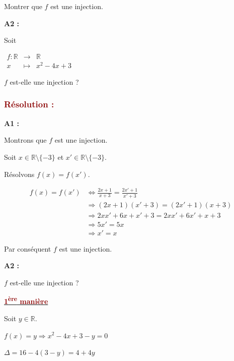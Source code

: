 \documentclass[12pt,a4paper]{article}
\begin{document}
Montrer que $f$ est une injection.


\bigskip

\textbf{A2 :}

Soit 

\(
\begin{array}{rcl}
f:\mathbb{R} & \longrightarrow & \mathbb{R}\\
x & \longmapsto & x^2-4x+3
\end{array}
\)

$f$ est-elle une injection ?


\subsubsection*{\textcolor{darkred}{Résolution :}}

\textbf{A1 :}

Montrons que $f$ est une injection.

Soit $x\in\mathbb{R}\setminus\{-3\}$ et
$x'\in\mathbb{R}\setminus\{-3\}$.

Résolvons $f(x)=f(x')$.

\[
\begin{aligned}
f(x)=f(x')
&\Longleftrightarrow
\frac{2x+1}{x+3}
=
\frac{2x'+1}{x'+3}\\
&\Longrightarrow
(2x+1)(x'+3)
=
(2x'+1)(x+3)\\
&\Longrightarrow
2xx'+6x+x'+3
=
2xx'+6x'+x+3\\
&\Longrightarrow
5x'=5x\\
&\Longrightarrow
x'=x
\end{aligned}
\]

Par conséquent $f$ est une injection.

\textbf{A2 :}

$f$ est-elle une injection ?

\underline{\textbf{\textcolor{darkred}{1\textsuperscript{ère} manière}}}

Soit $y\in\mathbb{R}$.

\(
f(x)=y
\Longrightarrow
x^2-4x+3-y=0
\)

\(
\Delta=16-4(3-y)=4+4y
\)


\end{document}
